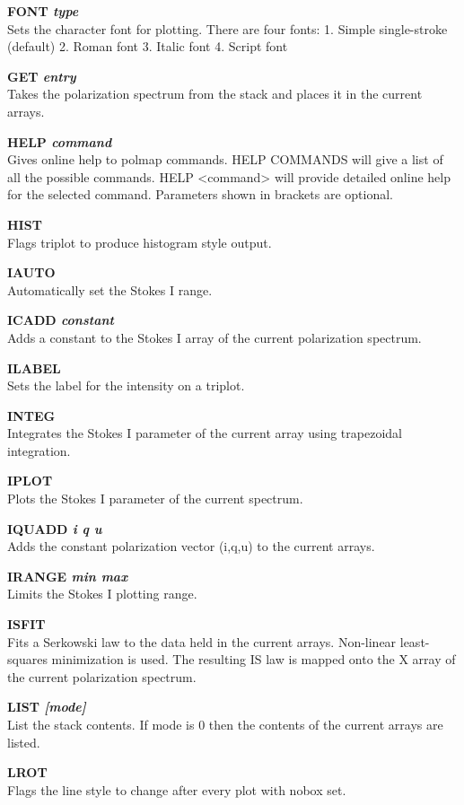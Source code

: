 \documentclass[11pt,nolof,noabs]{starlink}
\begin{document}
\textbf{FONT \it type} \\
Sets the character font for plotting. There are four fonts:
1. Simple single-stroke (default)
2. Roman font
3. Italic font
4. Script font

\textbf{GET \it entry } \\
Takes the polarization spectrum from the stack and places it in the current
arrays.

\textbf{HELP \it command} \\
Gives online help to polmap commands. HELP COMMANDS will give a list of
all the possible commands. HELP <command> will provide detailed online
help for the selected command. Parameters shown in brackets are optional.

\textbf{HIST} \\
Flags triplot to produce histogram style output.


\textbf{IAUTO} \\
Automatically set the Stokes I range.

\textbf{ICADD \it constant} \\
Adds a constant to the Stokes I array of the current polarization spectrum.

\textbf{ILABEL} \\
Sets the label for the intensity on a triplot.

\textbf{INTEG} \\
 Integrates the Stokes I parameter of the current array
using trapezoidal integration.

\textbf{IPLOT } \\
Plots the Stokes I parameter of the current spectrum.

\textbf{IQUADD \it i q u} \\
Adds the constant polarization vector (i,q,u) to the current arrays.

\textbf{IRANGE \it  min max } \\
Limits the Stokes I  plotting range.

\textbf{ISFIT} \\
Fits a Serkowski law to the data held in the current arrays.
Non-linear least-squares minimization is used.
The resulting IS law is mapped onto the X array of the current
polarization spectrum.

\textbf{LIST \it  [mode] } \\
List the stack contents. If  mode is 0 then the contents of the current
arrays are listed.

\textbf{LROT} \\
Flags the line style to change after every plot with nobox set.
\end{document}
